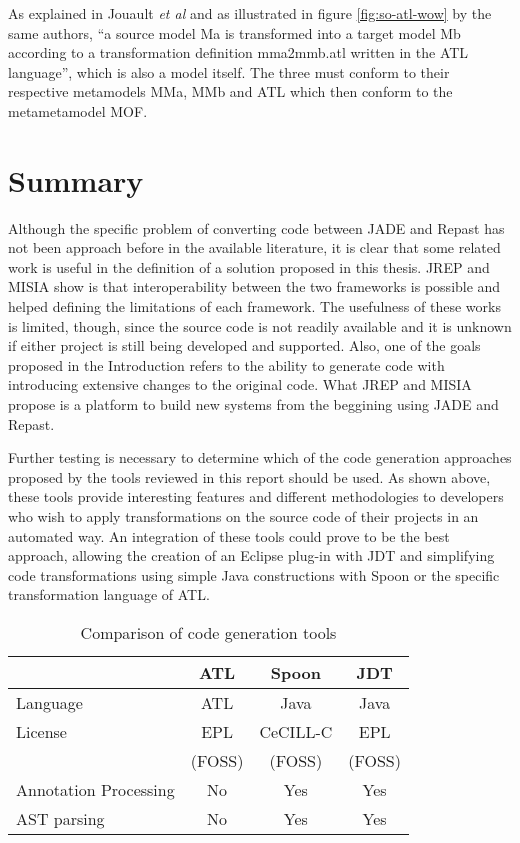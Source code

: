 	As explained in Jouault \emph{et al} and as illustrated in figure \ref{fig:so-atl-wow} by the same authors, ``a source model Ma is transformed into a target model Mb according to a transformation definition mma2mmb.atl written in the ATL language'', which is also a model itself. The three must conform to their respective metamodels MMa, MMb and ATL which then conform to the metametamodel MOF.


\section{Summary}
Although the specific problem of converting code between JADE and Repast has not been approach before in the available literature, it is clear that some related work is useful in the definition of a solution proposed in this thesis. JREP and MISIA show is that interoperability between the two frameworks is possible and helped defining the limitations of each framework. The usefulness of these works is limited, though, since the source code is not readily available and it is unknown if either project is still being developed and supported. Also, one of the goals proposed in the Introduction refers to the ability to generate code with introducing extensive changes to the original code. What JREP and MISIA propose is a platform to build new systems from the beggining using JADE and Repast.

Further testing is necessary to determine which of the code generation approaches proposed by the tools reviewed in this report should be used. As shown above, these tools provide interesting features and different methodologies to developers who wish to apply transformations on the source code of their projects in an automated way. An integration of these tools could prove to be the best approach, allowing the creation of an Eclipse plug-in with JDT and simplifying code transformations using simple Java constructions with Spoon or the specific transformation language of ATL.

\begin{table}[h]
	\caption{Comparison of code generation tools}
	\label{tab:codetools}
	\begin{center}
		\begin{tabular}{l|ccc}
		\hline

		\hline
		\textbf{} & \textbf{ATL} & \textbf{Spoon} & \textbf{JDT} \\
		\hline
			Language & ATL 		& Java 		& Java \\
		\hline
			License & EPL 		& CeCILL-C 	& EPL \\
					& (FOSS) 	& (FOSS)	& (FOSS) \\
		\hline
			Annotation Processing & No & Yes & Yes \\
		\hline
			AST parsing & No & Yes & Yes \\
		\hline
		\end{tabular}
	\end{center}
\end{table}

